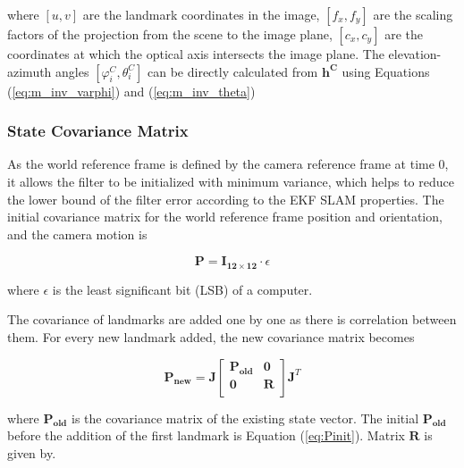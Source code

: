 \noindent where $[u, v]$ are the landmark coordinates in the image, $
[f_{x}, f_{y}]$ are the scaling factors of the projection from the scene
to the image plane, $[c_x, c_y]$ are the coordinates at which the optical axis
intersects the image plane. The elevation-azimuth angles $[\varphi
_{i}^{C}, \theta _{i}^{C}]$ can be directly calculated from
$\boldsymbol{h^{C}}$ using Equations (\ref{eq:m_inv_varphi}) and (\ref{eq:m_inv_theta})

\subsubsection{State Covariance Matrix}

As the world reference frame is defined by the camera reference frame
at time 0, it allows the filter to be initialized with minimum
variance, which helps to reduce the lower bound of the filter error
according to the EKF SLAM properties. The initial covariance matrix for the
world reference frame position and orientation, and the camera motion is

\begin{equation}
\label{eq:Pinit}
\boldsymbol{P}=\boldsymbol{I_{12\times 12}}\cdot \epsilon 
\end{equation}

\noindent where $\epsilon $ is the least significant bit (LSB) of a
computer.

The covariance of landmarks are added one by one as there is 
correlation between them. For every new landmark added, the new 
covariance matrix becomes

\begin{equation}
\label{eq:Pnew}
\boldsymbol{P_{new}}=\boldsymbol{J}\begin{bmatrix}
\boldsymbol{P_{old}} & \boldsymbol{0} \\
\boldsymbol{0} & \boldsymbol{R} \\
\end{bmatrix}
\boldsymbol{J}^{T}
\end{equation}

\noindent where $\boldsymbol{P_{old}}$ is the covariance matrix of the existing
state vector. The initial $\boldsymbol{P_{old}}$ before the addition of the first landmark is Equation (\ref{eq:Pinit}). Matrix $\boldsymbol{R}$ is given by.

